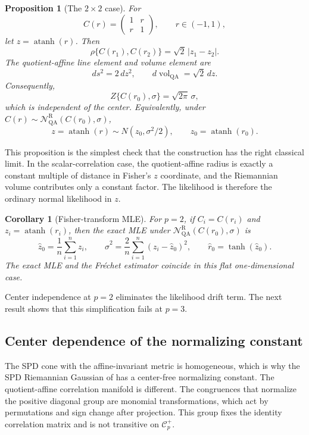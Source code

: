 \documentclass[
  12pt]{article}
\newcommand{\Corr}{\mathcal C^+}
\newcommand{\vol}{\operatorname{vol}}
\newcommand{\QA}{\mathrm{QA}}
\newcommand{\NR}{\mathcal N^{\mathrm R}_{\mathrm{QA}}}
\newtheorem{proposition}{Proposition}
\newtheorem{corollary}{Corollary}
\begin{document}
\begin{proposition}[The $2\times2$ case]\label{prop:p2}
For
\[
C(r)=\begin{pmatrix}1&r\\ r&1\end{pmatrix},\qquad r\in(-1,1),
\]
let $z=\operatorname{atanh}(r)$. Then
\begin{equation}\label{eq:p2_distance}
\rho\{C(r_1),C(r_2)\}=\sqrt{2}\,|z_1-z_2|.
\end{equation}
The quotient-affine line element and volume element are
\[
ds^2=2\,dz^2,
\qquad
 d\vol_{\QA}=\sqrt2\,dz.
\]
Consequently,
\[
Z\{C(r_0),\sigma\}=\sqrt{2\pi}\,\sigma,
\]
which is independent of the center. Equivalently, under $C(r)\sim\NR(C(r_0),\sigma)$,
\[
z=\operatorname{atanh}(r)\sim N(z_0,\sigma^2/2),\qquad z_0=\operatorname{atanh}(r_0).
\]
\end{proposition}

This proposition is the simplest check that the construction has the right classical limit. In the scalar-correlation case, the quotient-affine radius is exactly a constant multiple of distance in Fisher's $z$ coordinate, and the Riemannian volume contributes only a constant factor. The likelihood is therefore the ordinary normal likelihood in $z$.

\begin{corollary}[Fisher-transform MLE]\label{cor:p2_mle}
For $p=2$, if $C_i=C(r_i)$ and $z_i=\operatorname{atanh}(r_i)$, then the exact MLE under $\NR(C(r_0),\sigma)$ is
\begin{equation}\label{eq:p2_mle}
\widehat z_0=\frac1n\sum_{i=1}^n z_i,
\qquad
\widehat\sigma^2=\frac{2}{n}\sum_{i=1}^n(z_i-\widehat z_0)^2,
\qquad
\widehat r_0=\tanh(\widehat z_0).
\end{equation}
The exact MLE and the Fr\'echet estimator coincide in this flat one-dimensional case.
\end{corollary}

Center independence at $p=2$ eliminates the likelihood drift term. The next result shows that this simplification fails at $p=3$.



\subsection{Center dependence of the normalizing constant}\label{sec:center_dependence}

The SPD cone with the affine-invariant metric is homogeneous, which is why the SPD Riemannian Gaussian of \citet{said_2017_RiemannianGaussianDistributions} has a center-free normalizing constant. The quotient-affine correlation manifold is different. The congruences that normalize the positive diagonal group are monomial transformations, which act by permutations and sign change after projection. This group fixes the identity correlation matrix and is not transitive on $\Corr_p$.
\end{document}
